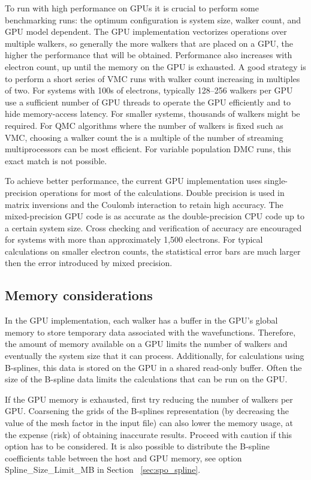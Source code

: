 To run with high performance on GPUs it is crucial to perform some
benchmarking runs: the optimum configuration is system size, walker
count, and GPU model dependent. The GPU implementation vectorizes
operations over multiple walkers, so generally the more walkers that
are placed on a GPU, the higher the performance that will be
obtained. Performance also increases with electron count, up until the
memory on the GPU is exhausted. A good strategy is to perform a short
series of VMC runs with walker count increasing in multiples of
two. For systems with 100s of electrons, typically 128--256 walkers per
GPU use a sufficient number of GPU threads to operate the GPU
efficiently and to hide memory-access latency. For smaller systems,
thousands of walkers might be required. For QMC algorithms where the number of
walkers is fixed such as VMC, choosing a walker count the is a multiple of the
number of streaming multiprocessors can be most efficient. For
variable population DMC runs, this exact match is not possible.

To achieve better performance, the current GPU implementation uses
single-precision operations for most of the calculations. Double
precision is used in matrix inversions and the Coulomb interaction to
retain high accuracy. The mixed-precision GPU code is as accurate as
the double-precision CPU code up to a certain system size. Cross
checking and verification of accuracy are encouraged for systems with
more than approximately 1,500 electrons. For typical calculations on
smaller electron counts, the statistical error bars are much larger
then the error introduced by mixed precision.


\subsection{Memory considerations}

In the GPU implementation, each walker has a buffer in the GPU's
global memory to store temporary data associated with the
wavefunctions. Therefore, the amount of memory available on a GPU
limits the number of walkers and eventually the system size that it
can process. Additionally, for calculations using B-splines, this data
is stored on the GPU in a shared read-only buffer. Often the size of the
B-spline data limits the calculations that can be run on the GPU.

If the GPU memory is exhausted, first try reducing the number of walkers per GPU.
Coarsening the grids of the B-splines representation (by decreasing
the value of the mesh factor in the input file) can also lower the memory
usage, at the expense (risk) of obtaining inaccurate results. Proceed
with caution if this option has to be considered.  It is also possible
to distribute the B-spline coefficients table between the host and GPU
memory, see option Spline\_Size\_Limit\_MB in
Section ~\ref{sec:spo_spline}.
